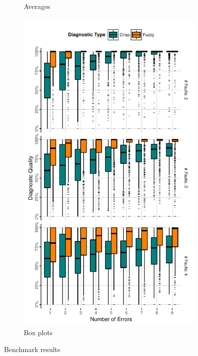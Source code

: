 \begin{figure}[ht]
\begin{center}
\begin{subfigure}{0.43\columnwidth}
      \caption{Averages\label{fig:fuzzinel:res1}}
    \end{subfigure}%
    \begin{subfigure}{0.57\columnwidth}
      \setlength{\fboxsep}{0em}
      \noindent
      \includegraphics[trim=3em 0.5em 0.5em 1em,clip=true]{figures/fuzzinel/figures/plot3.pdf}
      \caption{Box plots\label{fig:fuzzinel:res3}}
    \end{subfigure}
  \end{center}
  \caption{Benchmark results}
\end{figure}


